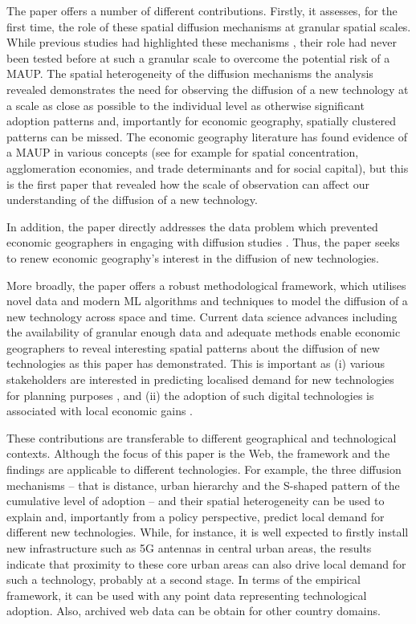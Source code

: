 \documentclass[
  authoryear,
  preprint,
  3p]{elsarticle}
\begin{document}
The paper offers a number of different contributions. Firstly, it
assesses, for the first time, the role of these spatial diffusion
mechanisms at granular spatial scales. While previous studies had
highlighted these mechanisms
\citep{hagerstrand1968innovation, rogers2010diffusion, grubler1990rise},
their role had never been tested before at such a granular scale to
overcome the potential risk of a MAUP. The spatial heterogeneity of the
diffusion mechanisms the analysis revealed demonstrates the need for
observing the diffusion of a new technology at a scale as close as
possible to the individual level as otherwise significant adoption
patterns and, importantly for economic geography, spatially clustered
patterns can be missed. The economic geography literature has found
evidence of a MAUP in various concepts (see for example
\citet{briant2010dots} for spatial concentration, agglomeration
economies, and trade determinants and \citet{andini2019social} for
social capital), but this is the first paper that revealed how the scale
of observation can affect our understanding of the diffusion of a new
technology.

In addition, the paper directly addresses the data problem which
prevented economic geographers in engaging with diffusion studies
\citep{iso2005, kemeny2011international, zook2022mapping}. Thus, the
paper seeks to renew economic geography's interest in the diffusion of
new technologies.

More broadly, the paper offers a robust methodological framework, which
utilises novel data and modern ML algorithms and techniques to model the
diffusion of a new technology across space and time. Current data
science advances including the availability of granular enough data and
adequate methods enable economic geographers to reveal interesting
spatial patterns about the diffusion of new technologies as this paper
has demonstrated. This is important as (i) various stakeholders are
interested in predicting localised demand for new technologies for
planning purposes \citep{leibowicz2016representing, meade2021modelling},
and (ii) the adoption of such digital technologies is associated with
local economic gains
\citep{solow1957technical, aghion1990model, kemeny2011international, tranosuk, capello2024nexus}.

These contributions are transferable to different geographical and
technological contexts. Although the focus of this paper is the Web, the
framework and the findings are applicable to different technologies. For
example, the three diffusion mechanisms -- that is distance, urban
hierarchy and the S-shaped pattern of the cumulative level of adoption
-- and their spatial heterogeneity can be used to explain and,
importantly from a policy perspective, predict local demand for
different new technologies. While, for instance, it is well expected to
firstly install new infrastructure such as 5G antennas in central urban
areas, the results indicate that proximity to these core urban areas can
also drive local demand for such a technology, probably at a second
stage. In terms of the empirical framework, it can be used with any
point data representing technological adoption. Also, archived web data
can be obtain for other country domains.
\end{document}
